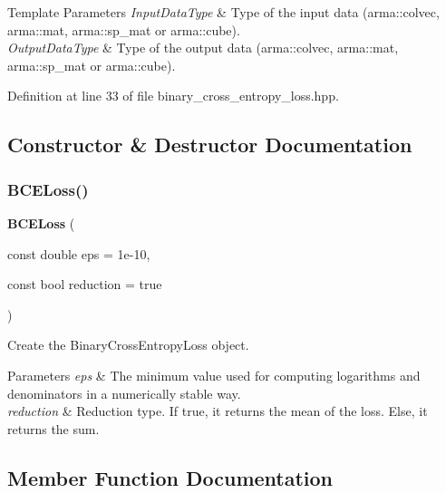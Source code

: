 \begin{DoxyTemplParams}{Template Parameters}
{\em Input\+Data\+Type} & Type of the input data (arma\+::colvec, arma\+::mat, arma\+::sp\+\_\+mat or arma\+::cube). \\
\hline
{\em Output\+Data\+Type} & Type of the output data (arma\+::colvec, arma\+::mat, arma\+::sp\+\_\+mat or arma\+::cube). \\
\hline
\end{DoxyTemplParams}


Definition at line 33 of file binary\+\_\+cross\+\_\+entropy\+\_\+loss.\+hpp.



\subsection{Constructor \& Destructor Documentation}
\mbox{\label{classmlpack_1_1ann_1_1BCELoss_a402089b368c1139c98bf07852e36987f}} 
\subsubsection{B\+C\+E\+Loss()}
{\footnotesize\ttfamily \textbf{ B\+C\+E\+Loss} (\begin{DoxyParamCaption}\item[{const double}]{eps = {\ttfamily 1e-\/10},  }\item[{const bool}]{reduction = {\ttfamily true} }\end{DoxyParamCaption})}



Create the Binary\+Cross\+Entropy\+Loss object. 


\begin{DoxyParams}{Parameters}
{\em eps} & The minimum value used for computing logarithms and denominators in a numerically stable way. \\
\hline
{\em reduction} & Reduction type. If true, it returns the mean of the loss. Else, it returns the sum. \\
\hline
\end{DoxyParams}


\subsection{Member Function Documentation}
\mbox{\label{classmlpack_1_1ann_1_1BCELoss_add41dbaf358dc099750dc6064cb7e0d7}} 
